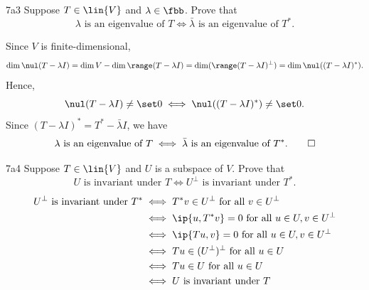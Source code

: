 \begin{exercise}{7a3}
    Suppose $T \in \lin{V}$ and $\lambda \in \fbb$.
    Prove that
    \[
        \lambda \text{ is an eigenvalue of } T \iff \bar{\lambda} \text{ is an eigenvalue of } T^\ast.
    \]
\end{exercise}

\begin{sol}
    Since $V$ is finite-dimensional,
    \[
        \dim \nul(T - \lambda I) = \dim V - \dim \range(T - \lambda I) = \dim(\range(T - \lambda I)^\perp) = \dim \nul((T - \lambda I)^\ast).
    \]
    Hence,
    \[
        \nul(T - \lambda I) \neq \set 0 \iff \nul((T - \lambda I)^\ast) \neq \set 0.
    \]
    Since $(T - \lambda I)^\ast = T^\ast - \bar{\lambda} I$, we have
    \[
        \lambda \text{ is an eigenvalue of } T \iff \bar{\lambda} \text{ is an eigenvalue of } T^\ast. \qedhere
    \]
\end{sol}

\begin{exercise}{7a4}
    Suppose $T \in \lin{V}$ and $U$ is a subspace of $V$.
    Prove that
    \[
        U \text{ is invariant under } T \iff U^\perp \text{ is invariant under } T^\ast.
    \]
\end{exercise}

\begin{sol}
    \begin{align*}
        U^\perp \text{ is invariant under } T^\ast &\iff T^\ast v \in U^\perp \text{ for all } v \in U^\perp \\
        &\iff \ip{u, T^\ast v} = 0 \text{ for all } u \in U, v \in U^\perp \\
        &\iff \ip{Tu, v} = 0 \text{ for all } u \in U, v \in U^\perp \\
        &\iff Tu \in (U^\perp)^\perp \text{ for all } u \in U \\
        &\iff Tu \in U \text{ for all } u \in U \\
        &\iff U \text{ is invariant under } T
    \end{align*}
\end{sol}


